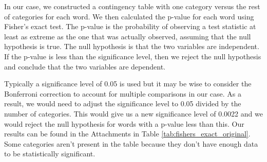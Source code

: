 In our case, we constructed a contingency table with one category versus the rest of categories for each word. We then calculated the p-value for each word using Fisher's exact test. The p-value is the probability of observing a test statistic at least as extreme as the one that was actually observed, assuming that the null hypothesis is true. The null hypothesis is that the two variables are independent. If the p-value is less than the significance level, then we reject the null hypothesis and conclude that the two variables are dependent. 

Typically a significance level of 0.05 is used but it may be wise to consider the Bonferroni correction to account for multiple comparisons in our case. As a result, we would need to adjust the significance level to 0.05 divided by the number of categories. This would give us a new significance level of 0.0022 and we would reject the null hypothesis for words with a p-value less than this. Our results can be found in the Attachments in Table \ref{tab:fishers_exact_original}. Some categories aren't present in the table because they don't have enough data to be statistically significant.